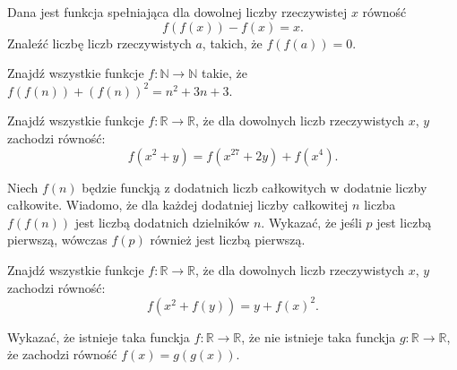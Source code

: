 \begin{problem}{1}
	Dana jest funkcja spełniająca dla dowolnej liczby rzeczywistej $x$ równość
	\[
		f(f(x)) - f(x) = x.
	\]
	Znaleźć liczbę liczb rzeczywistych $a$, takich, że $f(f(a)) = 0$.
\end{problem}

\begin{problem}{2}
	Znajdź wszystkie funkcje  $ f\colon \mathbb{N}\to\mathbb{N}$ takie, że  $ f(f(n))+(f(n))^2 =n^2 +3n+3$.
\end{problem}


\begin{problem}{3}
	Znajdź wszystkie funkcje $f:\mathbb{R}\longrightarrow\mathbb{R}$, że dla dowolnych liczb rzeczywistych $x$, $y$ zachodzi równość:
	\[
		f(x^2 + y) = f(x^{27} + 2y) + f(x^4).
	\]
\end{problem}

\begin{problem}{4}
	Niech $f(n)$ będzie funckją z dodatnich liczb całkowitych w dodatnie liczby całkowite. Wiadomo, że dla każdej dodatniej liczby całkowitej $n$ liczba  $f(f(n))$ jest liczbą dodatnich dzielników $n$. Wykazać, że jeśli $p$ jest liczbą pierwszą, wówczas $f(p)$ również jest liczbą pierwszą.
\end{problem}

\begin{problem}{5}
	Znajdź wszystkie funkcje $f:\mathbb{R}\longrightarrow\mathbb{R}$, że dla dowolnych liczb rzeczywistych $x$, $y$ zachodzi równość:
	\[
		f(x^2+f(y))=y+f(x)^2.
	\]
\end{problem}

\begin{problem}{6}
	Wykazać, że istnieje taka funckja $f:\mathbb{R}\longrightarrow\mathbb{R}$, że nie istnieje taka funckja $g:\mathbb{R}\longrightarrow\mathbb{R}$, że zachodzi równość $f(x) = g(g(x))$.
\end{problem}

